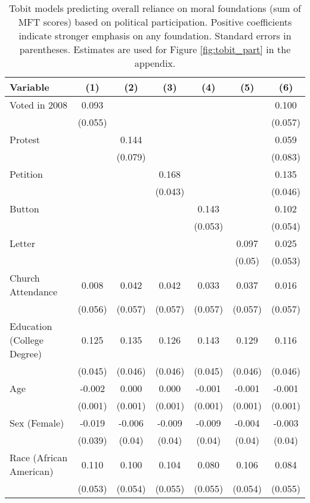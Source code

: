 \begin{table}[ht]
\centering
\caption{Tobit models predicting overall reliance on moral foundations
           (sum of MFT scores) based on political participation. Positive coefficients indicate 
           stronger emphasis on any foundation. Standard errors in parentheses. Estimates are 
           used for Figure \ref{fig:tobit_part} in the appendix.} 
\label{tab:tobit_part}
\begingroup\footnotesize
\begin{tabular}{lcccccc}
  \hline
Variable & (1) & (2) & (3) & (4) & (5) & (6) \\ 
  \hline
Voted in 2008 &  0.093 &  &  &  &  &  0.100 \\ 
   & (0.055) &  &  &  &  & (0.057) \\ 
  Protest &  &  0.144 &  &  &  &  0.059 \\ 
   &  & (0.079) &  &  &  & (0.083) \\ 
  Petition &  &  &  0.168 &  &  &  0.135 \\ 
   &  &  & (0.043) &  &  & (0.046) \\ 
  Button &  &  &  &  0.143 &  &  0.102 \\ 
   &  &  &  & (0.053) &  & (0.054) \\ 
  Letter &  &  &  &  &  0.097 &  0.025 \\ 
   &  &  &  &  & (0.05) & (0.053) \\ 
  Church Attendance &  0.008 &  0.042 &  0.042 &  0.033 &  0.037 &  0.016 \\ 
   & (0.056) & (0.057) & (0.057) & (0.057) & (0.057) & (0.057) \\ 
  Education (College Degree) &  0.125 &  0.135 &  0.126 &  0.143 &  0.129 &  0.116 \\ 
   & (0.045) & (0.046) & (0.046) & (0.045) & (0.046) & (0.046) \\ 
  Age & -0.002 &  0.000 &  0.000 & -0.001 & -0.001 & -0.001 \\ 
   & (0.001) & (0.001) & (0.001) & (0.001) & (0.001) & (0.001) \\ 
  Sex (Female) & -0.019 & -0.006 & -0.009 & -0.009 & -0.004 & -0.003 \\ 
   & (0.039) & (0.04) & (0.04) & (0.04) & (0.04) & (0.04) \\ 
  Race (African American) &  0.110 &  0.100 &  0.104 &  0.080 &  0.106 &  0.084 \\ 
   & (0.053) & (0.054) & (0.055) & (0.055) & (0.054) & (0.055) \\ 

\end{tabular}
\end{table}
